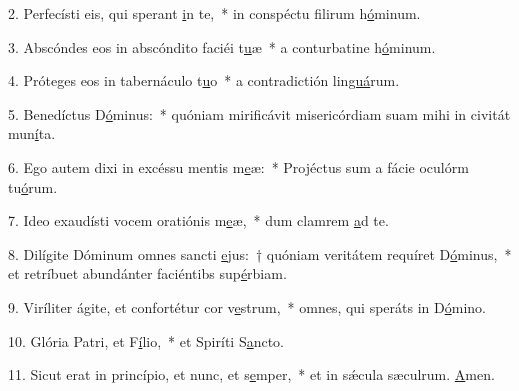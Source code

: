 2. Perfecísti eis, qui sperant \uline{i}n te,~* in conspéctu filirum h\uline{ó}minum.\par 
3. Abscóndes eos in abscóndito faciéi t\uline{u}æ~* a conturbatine h\uline{ó}minum.\par 
4. Próteges eos in tabernáculo t\uline{u}o~* a contradictión lin\uline{guá}rum.\par 
5. Benedíctus D\uline{ó}minus:~* quóniam mirificávit misericórdiam suam mihi in civitát mun\uline{í}ta.\par 
6. Ego autem dixi in excéssu mentis m\uline{e}æ:~* Projéctus sum a fácie oculórm tu\uline{ó}rum.\par 
7. Ideo exaudísti vocem oratiónis m\uline{e}æ,~* dum clamrem \uline{a}d te.\par 
8. Dilígite Dóminum omnes sancti \uline{e}jus:~† quóniam veritátem requíret D\uline{ó}minus,~* et retríbuet abundánter faciéntibs sup\uline{é}rbiam.\par 
9. Viríliter ágite, et confortétur cor v\uline{e}strum,~* omnes, qui speráts in D\uline{ó}mino.\par 
10. Glória Patri, et F\uline{í}lio,~* et Spiríti S\uline{a}ncto.\par 
11. Sicut erat in princípio, et nunc, et s\uline{e}mper,~* et in sǽcula sæculrum. \uline{A}men.\par 
